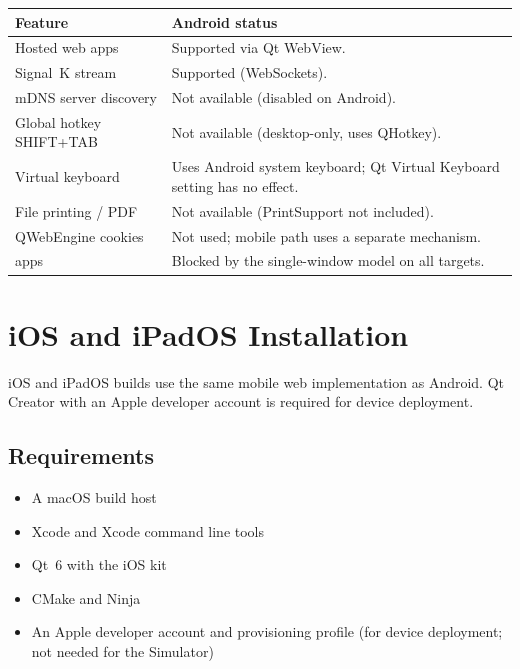 \begin{longtable}{L{5.2cm}L{8.5cm}}
\toprule
{}
\color{white}\sffamily\bfseries Feature &
\color{white}\sffamily\bfseries Android status \\
\midrule
Hosted web apps          & Supported via Qt WebView. \\
Signal~K stream          & Supported (WebSockets). \\
mDNS server discovery    & Not available (disabled on Android). \\
Global hotkey SHIFT+TAB  & Not available (desktop-only, uses QHotkey). \\
Virtual keyboard         & Uses Android system keyboard; Qt Virtual Keyboard setting has no effect. \\
File printing / PDF      & Not available (PrintSupport not included). \\
QWebEngine cookies       & Not used; mobile path uses a separate mechanism. \\
 apps      & Blocked by the single-window model on all targets. \\
\bottomrule
\end{longtable}

\section{iOS and iPadOS Installation}
\label{app:ios}

iOS and iPadOS builds use the same mobile web implementation as Android.
Qt Creator with an Apple developer account is required for device deployment.

\subsection{Requirements}

\begin{itemize}
  \item A macOS build host
  \item Xcode and Xcode command line tools
  \item Qt~6 with the iOS kit
  \item CMake and Ninja
  \item An Apple developer account and provisioning profile
        (for device deployment; not needed for the Simulator)
\end{itemize}


